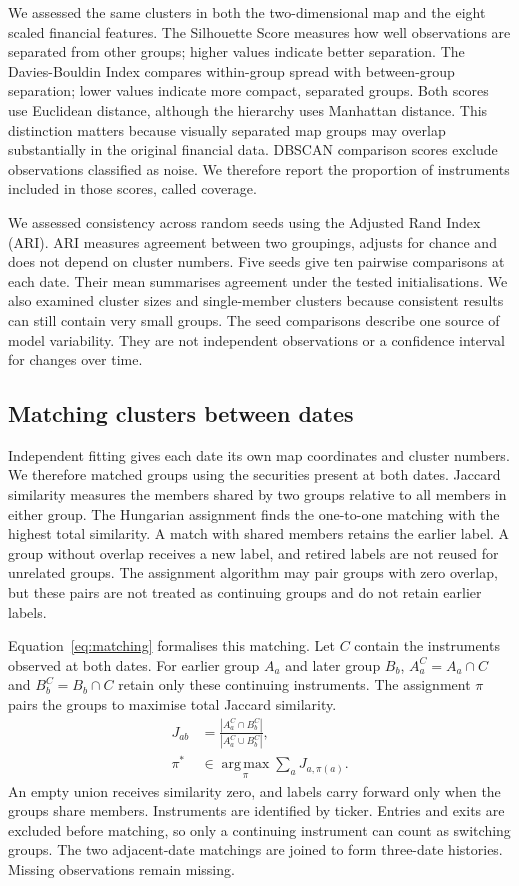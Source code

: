 We assessed the same clusters in both the two-dimensional map and the eight scaled financial features. The Silhouette Score measures how well observations are separated from other groups; higher values indicate better separation. The Davies-Bouldin Index compares within-group spread with between-group separation; lower values indicate more compact, separated groups. Both scores use Euclidean distance, although the hierarchy uses Manhattan distance. This distinction matters because visually separated map groups may overlap substantially in the original financial data. DBSCAN comparison scores exclude observations classified as noise. We therefore report the proportion of instruments included in those scores, called coverage.


We assessed consistency across random seeds using the Adjusted Rand Index (ARI). ARI measures agreement between two groupings, adjusts for chance and does not depend on cluster numbers. Five seeds give ten pairwise comparisons at each date. Their mean summarises agreement under the tested initialisations. We also examined cluster sizes and single-member clusters because consistent results can still contain very small groups. The seed comparisons describe one source of model variability. They are not independent observations or a confidence interval for changes over time.


\subsection{Matching clusters between dates}

Independent fitting gives each date its own map coordinates and cluster numbers. We therefore matched groups using the securities present at both dates. Jaccard similarity measures the members shared by two groups relative to all members in either group. The Hungarian assignment finds the one-to-one matching with the highest total similarity. A match with shared members retains the earlier label. A group without overlap receives a new label, and retired labels are not reused for unrelated groups. The assignment algorithm may pair groups with zero overlap, but these pairs are not treated as continuing groups and do not retain earlier labels.


Equation~\ref{eq:matching} formalises this matching. Let $C$ contain the instruments observed at both dates. For earlier group $A_a$ and later group $B_b$, $A_a^C=A_a\cap C$ and $B_b^C=B_b\cap C$ retain only these continuing instruments. The assignment $\pi$ pairs the groups to maximise total Jaccard similarity.
\begin{align}
J_{ab}&=\frac{|A_a^C\cap B_b^C|}{|A_a^C\cup B_b^C|},\\
\pi^*&\in\operatorname*{arg\,max}_{\pi}\sum_a J_{a,\pi(a)}.
\label{eq:matching}\end{align}
An empty union receives similarity zero, and labels carry forward only when the groups share members. Instruments are identified by ticker. Entries and exits are excluded before matching, so only a continuing instrument can count as switching groups. The two adjacent-date matchings are joined to form three-date histories. Missing observations remain missing.

